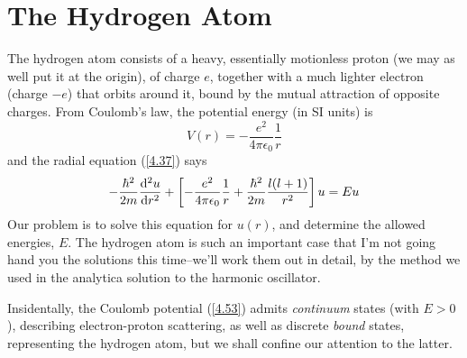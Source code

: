 


 

 

 





























\section{The Hydrogen Atom}
The hydrogen atom consists of a heavy, essentially motionless proton (we may as well put it at the origin), of charge $e$, together with a much lighter electron (charge $-e$) that orbits around it, bound by the mutual attraction of opposite charges. From Coulomb's law, the potential energy (in SI units) is
\begin{equation}\label{4.52}
	V(r)=-\frac{e^2}{4\pi\epsilon_0}\frac{1}{r}
\end{equation}
and the radial equation (\ref{4.37}) says
\begin{equation}\label{4.53}
	-\frac{\hbar^2}{2m}\dv[2]{u}{r}+\left[-\frac{e^2}{4\pi\epsilon_0}\frac{1}{r}+\frac{\hbar^2}{2m}\frac{l(l+1)}{r^2}\right]u=Eu
\end{equation}
Our problem is to solve this equation for $u(r)$, and determine the allowed energies, $E$. The hydrogen atom is such an important case that I'm not going hand you the solutions this time--we'll work them out in detail, by the method we used in the analytica solution to the harmonic oscillator. 

Insidentally, the Coulomb potential (\ref{4.53}) admits \textit{continuum} states (with $E>0$), describing electron-proton scattering, as well as discrete \textit{bound} states, representing the hydrogen atom, but we shall confine our attention to the latter.

